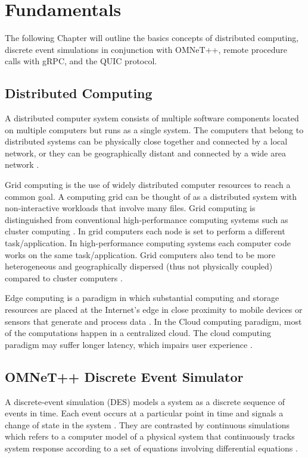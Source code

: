 \chapter{Fundamentals}

The following Chapter will outline the basics concepts of distributed computing, discrete event simulations in conjunction with OMNeT++, remote procedure calls with gRPC, and the QUIC protocol.

\section{Distributed Computing}

A distributed computer system consists of multiple software components located on multiple computers but runs as a single system. The computers that belong to distributed systems can be physically close together and connected by a local network, or they can be geographically distant and connected by a wide area network \cite{ibm:distributedcomputing}.

Grid computing is the use of widely distributed computer resources to reach a common goal. A computing grid can be thought of as a distributed system with non-interactive workloads that involve many files. Grid computing is distinguished from conventional high-performance computing systems such as cluster computing \cite{foster2008cloud}. In grid computers each node is set to perform a different task/application. In high-performance computing systems each computer code works on the same task/application. Grid computers also tend to be more heterogeneous and geographically dispersed (thus not physically coupled) compared to cluster computers \cite{wiki:Grid_computing}.

Edge computing is a paradigm in which substantial computing and storage resources are placed at the Internet’s edge in close proximity to mobile devices or sensors that generate and process data \cite{satyanarayanan2017emergence}. In the Cloud computing paradigm, most of the computations happen in a centralized cloud. The cloud computing paradigm may suffer longer latency, which impairs user experience \cite{shi2016edge}. 

\section{OMNeT++ Discrete Event Simulator}

A discrete-event simulation (DES) models a system as a discrete sequence of events in time. Each event occurs at a particular point in time and signals a change of state in the system \cite{wiki:des}. They are contrasted by continuous simulations which refers to a computer model of a physical system that continuously tracks system response according to a set of equations involving differential equations \cite{wiki:contsim}.

